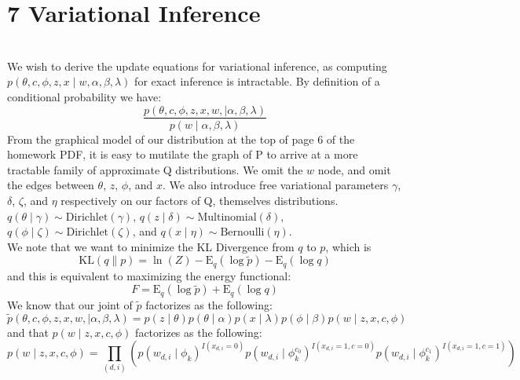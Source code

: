 \documentclass[12pt]{article}
\begin{document}
\section*{7 Variational Inference}
\\
We wish to derive the update equations for variational inference, as computing $p(\theta, c, \phi, z, x \mid w, \alpha, \beta, \lambda)$ for exact inference is intractable.  By definition of a conditional probability we have:
\begin{equation*}
\frac{p(\theta, c, \phi, z, x, w, \mid \alpha, \beta, \lambda)}{p(w \mid \alpha, \beta, \lambda)}
\end{equation*}
From the graphical model of our distribution at the top of page 6 of the homework PDF, it is easy to mutilate the graph of P to arrive at a more tractable family of approximate Q distributions.  We omit the $w$ node, and omit the edges between $\theta$, $z$, $\phi$, and $x$.  We also introduce free variational parameters $\gamma$, $\delta$, $\zeta$, and $\eta$ respectively on our factors of Q, themselves distributions.  $q(\theta \mid \gamma) \sim \mathrm{Dirichlet}(\gamma)$, $q(z \mid \delta) \sim \mathrm{Multinomial}(\delta)$, $q(\phi \mid \zeta) \sim \mathrm{Dirichlet}(\zeta)$, and $q(x \mid \eta) \sim \mathrm{Bernoulli}(\eta)$.\\
We note that we want to minimize the KL Divergence from $q$ to $p$, which is
\begin{equation*}
\mathrm{KL}(q\|p) = \ln(Z) - \mathrm{E}_q (\log \widetilde{p}) - \mathrm{E}_q (\log q) 
\end{equation*}
and this is equivalent to maximizing the energy functional:
\begin{equation*}
F = \mathrm{E}_q (\log \widetilde{p}) + \mathrm{E}_q (\log q)
\end{equation*}
We know that our joint of $\widetilde{p}$ factorizes as the following:
\begin{equation*}
\widetilde{p}(\theta, c, \phi, z, x, w, \mid \alpha, \beta, \lambda) = p(z \mid \theta) p(\theta \mid \alpha) p(x \mid \lambda) p(\phi \mid \beta) p(w \mid z, x, c, \phi)
\end{equation*}
and that $p(w \mid z, x, c, \phi)$ factorizes as the following:
\begin{equation*}
p(w \mid z, x, c, \phi) = \prod_{(d,i)} ( p(w_{d,i} \mid \phi_k)^{I(x_{d,i} = 0)} p(w_{d,i} \mid \phi_{k}^{c_0})^{I(x_{d,i} = 1, c= 0)} p(w_{d,i} \mid \phi_{k}^{c_1})^{I(x_{d,i} = 1, c= 1)})
\end{equation*}
\end{document}
